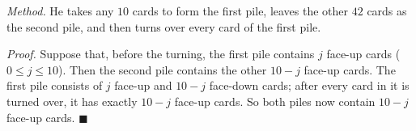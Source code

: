 \emph{Method.} He takes any $10$ cards to form the first pile, leaves the other $42$ cards as the second pile, and then turns over every card of the first pile.

\emph{Proof.} Suppose that, before the turning, the first pile contains $j$ face-up cards ($0\le j\le10$). Then the second pile contains the other $10-j$ face-up cards. The first pile consists of $j$ face-up and $10-j$ face-down cards; after every card in it is turned over, it has exactly $10-j$ face-up cards. So both piles now contain $10-j$ face-up cards. $\blacksquare$
